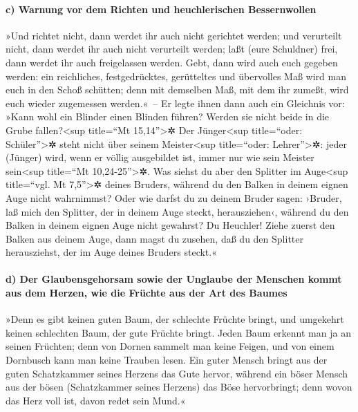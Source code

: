 \hypertarget{c-warnung-vor-dem-richten-und-heuchlerischen-bessernwollen}{%
\paragraph{c) Warnung vor dem Richten und heuchlerischen
Bessernwollen}\label{c-warnung-vor-dem-richten-und-heuchlerischen-bessernwollen}}

 »Und richtet nicht, dann werdet ihr auch nicht gerichtet
werden; und verurteilt nicht, dann werdet ihr auch nicht verurteilt
werden; laßt (eure Schuldner) frei, dann werdet ihr auch freigelassen
werden.  Gebt, dann wird auch euch gegeben werden: ein
reichliches, festgedrücktes, gerütteltes und übervolles Maß wird man
euch in den Schoß schütten; denn mit demselben Maß, mit dem ihr zumeßt,
wird euch wieder zugemessen werden.«~--  Er legte ihnen
dann auch ein Gleichnis vor: »Kann wohl ein Blinder einen Blinden
führen? Werden sie nicht beide in die Grube fallen?\textless sup
title=``Mt 15,14''\textgreater✲  Der Jünger\textless sup
title=``oder: Schüler''\textgreater✲ steht nicht über seinem
Meister\textless sup title=``oder: Lehrer''\textgreater✲: jeder (Jünger)
wird, wenn er völlig ausgebildet ist, immer nur wie sein Meister
sein\textless sup title=``Mt 10,24-25''\textgreater✲. 
Was siehst du aber den Splitter im Auge\textless sup title=``vgl. Mt
7,5''\textgreater✲ deines Bruders, während du den Balken in deinem
eignen Auge nicht wahrnimmst?  Oder wie darfst du zu
deinem Bruder sagen: ›Bruder, laß mich den Splitter, der in deinem Auge
steckt, herausziehen‹, während du den Balken in deinem eignen Auge nicht
gewahrst? Du Heuchler! Ziehe zuerst den Balken aus deinem Auge, dann
magst du zusehen, daß du den Splitter herausziehst, der im Auge deines
Bruders steckt.«

\hypertarget{d-der-glaubensgehorsam-sowie-der-unglaube-der-menschen-kommt-aus-dem-herzen-wie-die-fruxfcchte-aus-der-art-des-baumes}{%
\paragraph{d) Der Glaubensgehorsam sowie der Unglaube der Menschen kommt
aus dem Herzen, wie die Früchte aus der Art des
Baumes}\label{d-der-glaubensgehorsam-sowie-der-unglaube-der-menschen-kommt-aus-dem-herzen-wie-die-fruxfcchte-aus-der-art-des-baumes}}

 »Denn es gibt keinen guten Baum, der schlechte Früchte
bringt, und umgekehrt keinen schlechten Baum, der gute Früchte bringt.
 Jeden Baum erkennt man ja an seinen Früchten; denn von
Dornen sammelt man keine Feigen, und von einem Dornbusch kann man keine
Trauben lesen.  Ein guter Mensch bringt aus der guten
Schatzkammer seines Herzens das Gute hervor, während ein böser Mensch
aus der bösen (Schatzkammer seines Herzens) das Böse hervorbringt; denn
wovon das Herz voll ist, davon redet sein Mund.«

